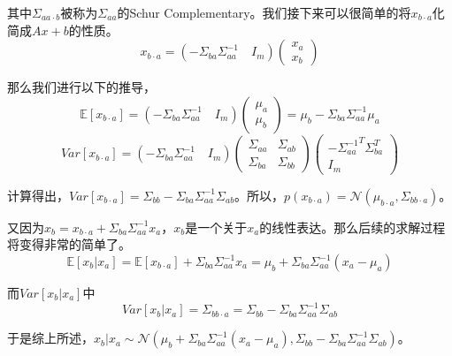 \documentclass[a4paper]{article}
\numberwithin{equation}{section}
\begin{document}
其中$\Sigma_{aa\cdot b}$被称为$\Sigma_{aa}$的Schur Complementary。我们接下来可以很简单的将$x_{b\cdot a}$化简成$Ax+b$的性质。
\begin{equation}
    x_{b\cdot a} = (-\Sigma_{ba}\Sigma_{aa}^{-1}\quad I_m)
    \begin{pmatrix}
        x_a \\
        x_b
    \end{pmatrix}
\end{equation}

那么我们进行以下的推导，
\begin{equation}
    \mathbb{E}[x_{b\cdot a}]= (-\Sigma_{ba}\Sigma_{aa}^{-1}\quad I_m)
    \begin{pmatrix}
        \mu_a \\
        \mu_b
    \end{pmatrix}
    =\mu_b-\Sigma_{ba}\Sigma_{aa}^{-1}\mu_a
\end{equation}
\begin{equation}
    Var[x_{b\cdot a}]=(-\Sigma_{ba}\Sigma_{aa}^{-1}\quad I_m)
    \begin{pmatrix}
    \Sigma_{aa} & \Sigma_{ab} \\
    \Sigma_{ba} & \Sigma_{bb} 
    \end{pmatrix}
    \begin{pmatrix}
        -{\Sigma_{aa}^{-1}}^T \Sigma_{ba}^T \\
        I_m
    \end{pmatrix}
\end{equation}

计算得出，$Var[x_{b\cdot a}]=\Sigma_{bb}-\Sigma_{ba}\Sigma_{aa}^{-1}\Sigma_{ab} $。所以，$p(x_{b\cdot a})=\mathcal{N}(\mu_{b\cdot a},\Sigma_{bb\cdot a})$。

又因为$x_b=x_{b\cdot a}+\Sigma_{ba}\Sigma_{aa}^{-1}x_a$，$x_b$是一个关于$x_a$的线性表达。那么后续的求解过程将变得非常的简单了。
\begin{equation}
    \mathbb{E}[x_b|x_a]=\mathbb{E}[x_{b\cdot a}] + \Sigma_{ba}\Sigma_{aa}^{-1}x_a = \mu_b+\Sigma_{ba}\Sigma_{aa}^{-1}(x_a-\mu_a)
\end{equation}

而$Var[x_b|x_a]$中
\begin{equation}
    Var[x_b|x_a] = \Sigma_{bb \cdot a} = \Sigma_{bb}-\Sigma_{ba}\Sigma_{aa}^{-1}\Sigma_{ab}
\end{equation}

于是综上所述，$x_b|x_a\sim \mathcal{N}(\mu_b+\Sigma_{ba}\Sigma_{aa}^{-1}(x_a-\mu_a), \Sigma_{bb}-\Sigma_{ba}\Sigma_{aa}^{-1}\Sigma_{ab})$。
\end{document}
